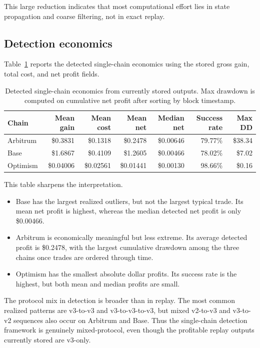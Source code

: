\documentclass[11pt]{article}
\begin{document}
This large reduction indicates that most computational effort lies in state propagation and coarse filtering, not in exact replay.

\subsection{Detection economics}

Table~\ref{tab:detection_econ} reports the detected single-chain economics using the stored gross gain, total cost, and net profit fields.

\begin{table}[H]
\centering
\caption{Detected single-chain economics from currently stored outputs. Max drawdown is computed on cumulative net profit after sorting by block timestamp.}
\label{tab:detection_econ}
\begin{tabular}{lrrrrrr}
\toprule
Chain & Mean gain & Mean cost & Mean net & Median net & Success rate & Max DD \\
\midrule
Arbitrum & \$0.3831 & \$0.1318 & \$0.2478 & \$0.00646 & 79.77\% & \$38.34 \\
Base & \$1.6867 & \$0.4109 & \$1.2605 & \$0.00466 & 78.02\% & \$7.02 \\
Optimism & \$0.04006 & \$0.02561 & \$0.01441 & \$0.00130 & 98.66\% & \$0.16 \\
\bottomrule
\end{tabular}
\end{table}

This table sharpens the interpretation.
\begin{itemize}[leftmargin=1.5em]
    \item Base has the largest realized outliers, but not the largest typical trade. Its mean net profit is highest, whereas the median detected net profit is only \$0.00466.
    \item Arbitrum is economically meaningful but less extreme. Its average detected profit is \$0.2478, with the largest cumulative drawdown among the three chains once trades are ordered through time.
    \item Optimism has the smallest absolute dollar profits. Its success rate is the highest, but both mean and median profits are small.
\end{itemize}

The protocol mix in detection is broader than in replay. The most common realized patterns are v3-to-v3 and v3-to-v3-to-v3, but mixed v2-to-v3 and v3-to-v2 sequences also occur on Arbitrum and Base. Thus the single-chain detection framework is genuinely mixed-protocol, even though the profitable replay outputs currently stored are v3-only.
\end{document}
